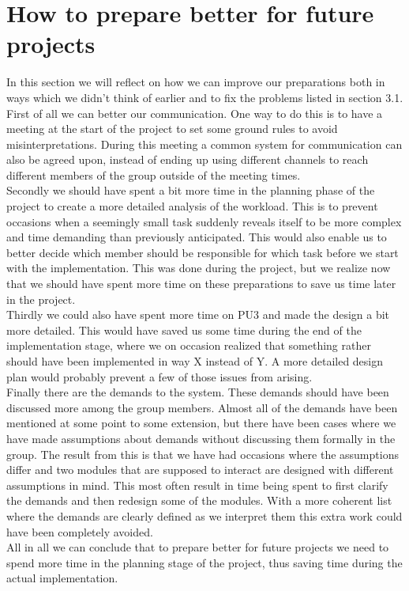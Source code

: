 \section{How to prepare better for future projects}
In this section we will reflect on how we can improve our preparations both in ways which we didn't think of earlier and to fix the problems listed in section 3.1.
First of all we can better our communication. One way to do this is to have a meeting at the start of the project to set some ground rules to avoid misinterpretations. During this meeting a common system for communication can also be agreed upon, instead of ending up using different channels to reach different members of the group outside of the meeting times. \\
Secondly we should have spent a bit more time in the planning phase of the project to create a more detailed analysis of the workload.  This is to prevent occasions when a seemingly small task suddenly reveals itself to be more complex and time demanding than previously anticipated. This would also enable us to better decide which member should be responsible for which task before we start with the implementation. This was done during the project, but we realize now that we should  have spent more time on these preparations to save us time later in the project. \\
Thirdly we could also have spent more time on PU3 and made the design a bit more detailed. This would have saved us some time during the end of the implementation stage, where we on occasion realized that something rather should have been implemented in way X instead of Y. A more detailed design plan would probably prevent a few of those issues from arising. \\
Finally there are the demands to the system. These demands should have been discussed more among the group members. Almost all of the demands have been mentioned at some point to some extension, but there have been cases where we have made assumptions about demands without discussing them formally in the group. The result from this is that we have had occasions where the assumptions differ and two modules that are supposed to interact are designed with different assumptions in mind. This most often result in time being spent to first clarify the demands and then redesign some of the modules. With a more coherent list where the demands are clearly defined as we interpret them this extra work could have been completely avoided. \\
All in all we can conclude that to prepare better for future projects we need to spend more time in the planning stage of the project, thus saving time during the actual implementation. 

